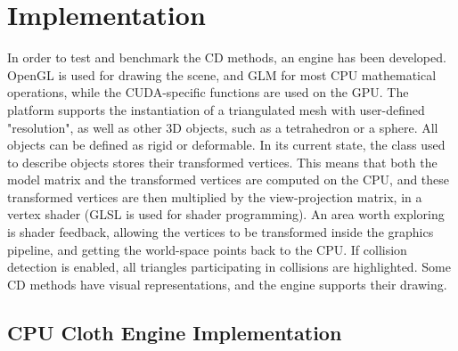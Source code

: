 \chapter{Implementation}
\label{section:implementation}

In order to test and benchmark the CD methods, an engine has been developed. OpenGL is used for drawing the scene, and GLM for most CPU mathematical operations, while the CUDA-specific functions are used on the GPU. The platform supports the instantiation of a triangulated mesh with user-defined "resolution", as well as other 3D objects, such as a tetrahedron or a sphere. All objects can be defined as rigid or deformable. In its current state, the class used to describe objects stores their transformed vertices. This means that both the model matrix and the transformed vertices are computed on the CPU, and these transformed vertices are then multiplied by the view-projection matrix, in a vertex shader (GLSL is used for shader programming). An area worth exploring is shader feedback, allowing the vertices to be transformed inside the graphics pipeline, and getting the world-space points back to the CPU. If collision detection is enabled, all triangles participating in collisions are highlighted. Some CD methods have visual representations, and the engine supports their drawing.



\section{CPU Cloth Engine Implementation}
\label{sec:cpu-impl}

